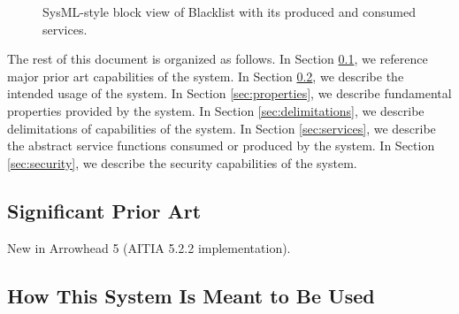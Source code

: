 \documentclass[a4paper]{arrowhead}
\begin{document}
\begin{figure}[ht!]
  \centering
  \caption{SysML-style block view of Blacklist with its produced and consumed services.}
  \label{fig:system}
\end{figure}

The rest of this document is organized as follows.
In Section \ref{sec:prior_art}, we reference major prior art capabilities of the system.
In Section \ref{sec:use}, we describe the intended usage of the system.
In Section \ref{sec:properties}, we describe fundamental properties provided by the system.
In Section \ref{sec:delimitations}, we describe delimitations of capabilities of the system.
In Section \ref{sec:services}, we describe the abstract service functions consumed or produced by the system.
In Section \ref{sec:security}, we describe the security capabilities of the system.

\newpage

\subsection{Significant Prior Art}
\label{sec:prior_art}

New in Arrowhead 5 (AITIA 5.2.2 implementation).

\subsection{How This System Is Meant to Be Used}
\label{sec:use}
\end{document}
